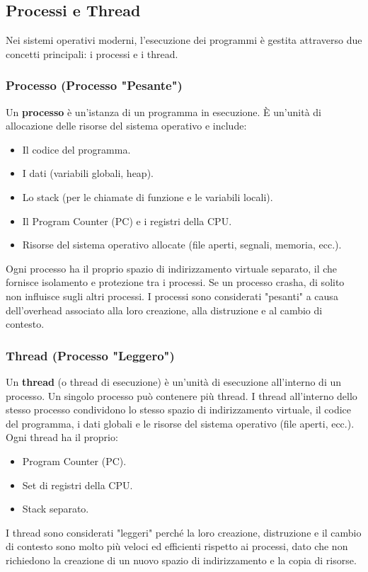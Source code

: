 \subsection{Processi e Thread}
Nei sistemi operativi moderni, l'esecuzione dei programmi è gestita attraverso due concetti principali: i processi e i thread.

\subsubsection{Processo (Processo "Pesante")}
Un \textbf{processo} è un'istanza di un programma in esecuzione. È un'unità di allocazione delle risorse del sistema operativo e include:
\begin{itemize}
    \item Il codice del programma.
    \item I dati (variabili globali, heap).
    \item Lo stack (per le chiamate di funzione e le variabili locali).
    \item Il Program Counter (PC) e i registri della CPU.
    \item Risorse del sistema operativo allocate (file aperti, segnali, memoria, ecc.).
\end{itemize}
Ogni processo ha il proprio spazio di indirizzamento virtuale separato, il che fornisce isolamento e protezione tra i processi. Se un processo crasha, di solito non influisce sugli altri processi. I processi sono considerati "pesanti" a causa dell'overhead associato alla loro creazione, alla distruzione e al cambio di contesto.

\subsubsection{Thread (Processo "Leggero")}
Un \textbf{thread} (o thread di esecuzione) è un'unità di esecuzione all'interno di un processo. Un singolo processo può contenere più thread. I thread all'interno dello stesso processo condividono lo stesso spazio di indirizzamento virtuale, il codice del programma, i dati globali e le risorse del sistema operativo (file aperti, ecc.). Ogni thread ha il proprio:
\begin{itemize}
    \item Program Counter (PC).
    \item Set di registri della CPU.
    \item Stack separato.
\end{itemize}
I thread sono considerati "leggeri" perché la loro creazione, distruzione e il cambio di contesto sono molto più veloci ed efficienti rispetto ai processi, dato che non richiedono la creazione di un nuovo spazio di indirizzamento e la copia di risorse.


